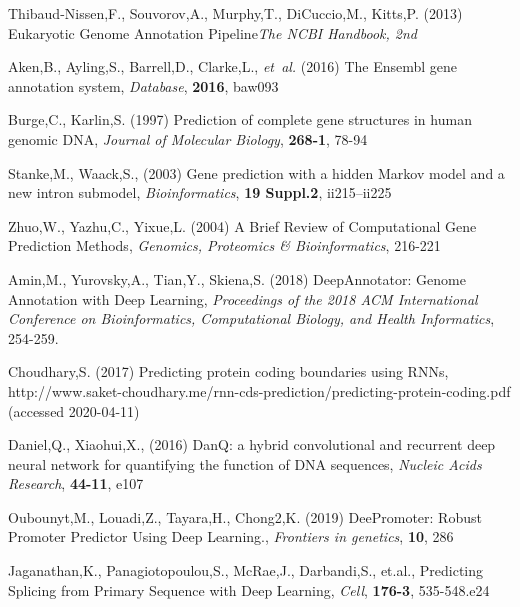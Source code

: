 \documentclass{bioinfo}
\begin{document}
\begin{thebibliography}{}

Thibaud-Nissen,F., Souvorov,A., Murphy,T., DiCuccio,M., Kitts,P. (2013) Eukaryotic Genome Annotation Pipeline{\it The NCBI Handbook, 2nd}

Aken,B., Ayling,S., Barrell,D., Clarke,L., {\it et~al.} (2016) The Ensembl gene annotation system, {\it Database}, {\bf 2016}, baw093

Burge,C., Karlin,S. (1997) Prediction of complete gene structures in human genomic DNA, {\it Journal of Molecular Biology}, {\bf 268-1}, 78-94

	Stanke,M., Waack,S., (2003) Gene prediction with a hidden Markov model and a new intron submodel, {\it Bioinformatics}, {\bf 19 Suppl.2}, ii215–ii225

Zhuo,W., Yazhu,C., Yixue,L. (2004) A Brief Review of Computational Gene Prediction Methods, {\it Genomics, Proteomics \& Bioinformatics}, 216-221

Amin,M., Yurovsky,A., Tian,Y., Skiena,S. (2018) DeepAnnotator: Genome Annotation with Deep Learning, {\it Proceedings of the 2018 ACM International Conference on Bioinformatics, Computational Biology, and Health Informatics}, 254-259.

Choudhary,S. (2017) Predicting protein coding boundaries using RNNs, http://www.saket-choudhary.me/rnn-cds-prediction/predicting-protein-coding.pdf (accessed 2020-04-11)

Daniel,Q., Xiaohui,X., (2016) DanQ: a hybrid convolutional and recurrent deep neural network for quantifying the function of DNA sequences, {\it Nucleic Acids Research}, {\bf 44-11}, e107

Oubounyt,M., Louadi,Z., Tayara,H., Chong2,K. (2019) DeePromoter: Robust Promoter Predictor Using Deep Learning., {\it Frontiers in genetics}, {\bf 10}, 286

Jaganathan,K., Panagiotopoulou,S., McRae,J., Darbandi,S., et.al., Predicting Splicing from Primary Sequence with Deep Learning, {\it Cell}, {\bf 176-3}, 535-548.e24


\end{thebibliography}
\end{document}
